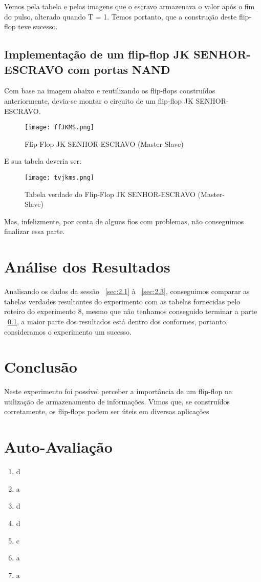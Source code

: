 \documentclass[12pt]{article}
\begin{document}
Vemos pela tabela e pelas imagens que o escravo armazenava o valor após o fim do pulso, alterado quando T = 1. Temos portanto, que a construção deste flip-flop teve sucesso.

\subsection{Implementação de um flip-flop JK SENHOR-ESCRAVO com portas NAND}
\label{sec:2.4}

Com base na imagem abaixo e reutilizando os flip-flops construídos anteriormente, devia-se montar o circuito de um flip-flop JK SENHOR-ESCRAVO.

\begin{figure}[H]
	\centering
	\texttt{[image: ffJKMS.png]}
	\caption{Flip-Flop JK SENHOR-ESCRAVO (Master-Slave)}
	\label{fig:ffJKMS}
\end{figure} 

E sua tabela deveria ser:

\begin{figure}[H]
	\centering
	\texttt{[image: tvjkms.png]}
	\caption{Tabela verdade do Flip-Flop JK SENHOR-ESCRAVO (Master-Slave)}
	\label{fig:tvJKMS}
\end{figure}

Mas, infelizmente, por conta de alguns fios com problemas, não conseguimos finalizar essa parte.


\section{Análise dos Resultados}
\label{sec:Resultados}

Analisando os dados da sessão ~\ref{sec:2.1} à ~\ref{sec:2.3}, conseguimos comparar as tabelas verdades resultantes do experimento com as tabelas fornecidas pelo roteiro do experimento 8, mesmo que não tenhamos conseguido terminar a parte ~\ref{sec:2.4}, a maior parte dos resultados está dentro dos conformes, portanto, consideramos o experimento um sucesso.
\section{Conclusão}
\label{sec:Conclusao}

Neste experimento foi possível perceber a importância de um flip-flop na utilização de armazenamento de informações. Vimos que, se construídos corretamente, os flip-flops podem ser úteis em diversas aplicações

\newpage 
\section*{Auto-Avaliação}

\begin{enumerate}
    \item d
    \item a
    \item d
    \item d
    \item c
    \item a
    \item a
\end{enumerate}
\end{document}
